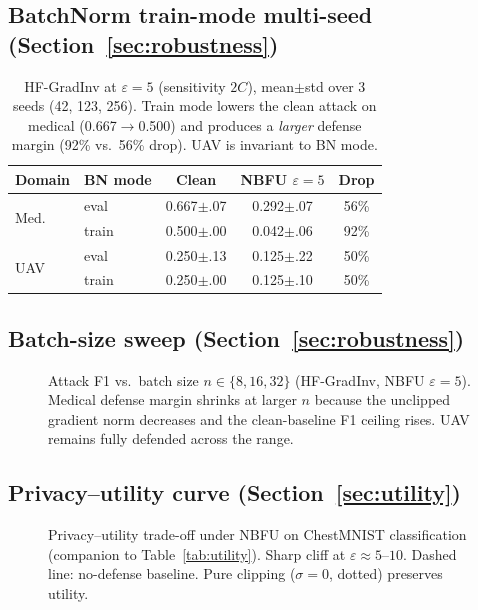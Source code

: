\documentclass[11pt]{article}
\begin{document}
\subsection{BatchNorm train-mode multi-seed (Section~\ref{sec:robustness})}
\begin{table}[h]
\centering
\small
\setlength{\tabcolsep}{3pt}
\begin{tabular}{llccc}
\toprule
Domain & BN mode & Clean & NBFU $\varepsilon{=}5$ & Drop \\
\midrule
\multirow{2}{*}{Med.}
 & eval  & 0.667$\pm$.07 & 0.292$\pm$.07 & 56\% \\
 & train & 0.500$\pm$.00 & 0.042$\pm$.06 & 92\% \\
\midrule
\multirow{2}{*}{UAV}
 & eval  & 0.250$\pm$.13 & 0.125$\pm$.22 & 50\% \\
 & train & 0.250$\pm$.00 & 0.125$\pm$.10 & 50\% \\
\bottomrule
\end{tabular}
\caption{HF-GradInv at $\varepsilon{=}5$ (sensitivity $2C$), mean$\pm$std over 3 seeds (42, 123, 256). Train mode lowers the clean attack on medical (0.667$\to$0.500) and produces a \emph{larger} defense margin (92\% vs.\ 56\% drop). UAV is invariant to BN mode.}
\label{tab:bntrain}
\end{table}

\subsection{Batch-size sweep (Section~\ref{sec:robustness})}
\begin{figure}[h]
\centering

\caption{Attack F1 vs.\ batch size $n \in \{8, 16, 32\}$ (HF-GradInv, NBFU $\varepsilon{=}5$). Medical defense margin shrinks at larger $n$ because the unclipped gradient norm decreases and the clean-baseline F1 ceiling rises. UAV remains fully defended across the range.}
\label{fig:batch}
\end{figure}

\subsection{Privacy--utility curve (Section~\ref{sec:utility})}
\begin{figure}[h]
\centering

\caption{Privacy--utility trade-off under NBFU on ChestMNIST classification (companion to Table~\ref{tab:utility}). Sharp cliff at $\varepsilon{\approx}5$--$10$. Dashed line: no-defense baseline. Pure clipping ($\sigma{=}0$, dotted) preserves utility.}
\label{fig:utility}
\end{figure}
\end{document}
